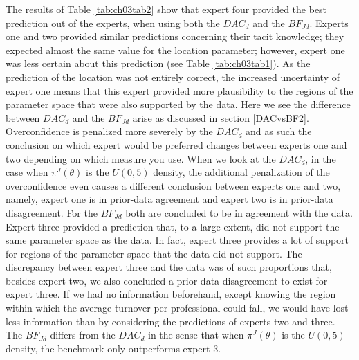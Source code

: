 \documentclass[openright,titlepage,12pt,a4paper]{book}
\begin{document}
The results of Table \ref{tab:ch03tab2} show that expert four provided the best prediction out of the experts, when using both the \(DAC_d\) and the \(BF_{Jd}\). Experts one and two provided similar predictions concerning their tacit knowledge; they expected almost the same value for the location parameter; however, expert one was less certain about this prediction (see Table \ref{tab:ch03tab1}). As the prediction of the location was not entirely correct, the increased uncertainty of expert one means that this expert provided more plausibility to the regions of the parameter space that were also supported by the data. Here we see the difference between \(DAC_d\) and the \(BF_{Jd}\) arise as discussed in section \ref{DACvsBF2}. Overconfidence is penalized more severely by the \(DAC_d\) and as such the conclusion on which expert would be preferred changes between experts one and two depending on which measure you use. When we look at the \(DAC_d\), in the case when \(\pi^J(\theta)\) is the \(U(0, 5)\) density, the additional penalization of the overconfidence even causes a different conclusion between experts one and two, namely, expert one is in prior-data agreement and expert two is in prior-data disagreement. For the \(BF_{Jd}\) both are concluded to be in agreement with the data. Expert three provided a prediction that, to a large extent, did not support the same parameter space as the data. In fact, expert three provides a lot of support for regions of the parameter space that the data did not support. The discrepancy between expert three and the data was of such proportions that, besides expert two, we also concluded a prior-data disagreement to exist for expert three. If we had no information beforehand, except knowing the region within which the average turnover per professional could fall, we would have lost less information than by considering the predictions of experts two and three. The \(BF_{Jd}\) differs from the \(DAC_d\) in the sense that when \(\pi^J(\theta)\) is the \(U(0, 5)\) density, the benchmark only outperforms expert 3.
\end{document}
